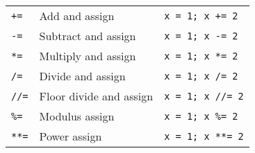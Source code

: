 \begin{table}[htbp]
\begin{minipage}{\linewidth}
\begin{tabulary}{\textwidth}{@{}LLL@{}}
    \texttt{+=}&Add and assign&\texttt{x = 1; x += 2}\\
    \texttt{-=}&Subtract and assign&\texttt{x = 1; x -= 2}\\
    \texttt{*=}&Multiply and assign&\texttt{x = 1; x *= 2}\\
    \texttt{\slash =}&Divide and assign&\texttt{x = 1; x \slash = 2}\\
    \texttt{/\slash =}&Floor divide and assign&\texttt{x = 1; x /\slash = 2}\\
    \texttt{\%=}&Modulus assign&\texttt{x = 1; x \%= 2}\\
    \texttt{**=}&Power assign&\texttt{x = 1; x **= 2}\\
    
    \bottomrule

  \end{tabulary}
      \end{minipage}
      \end{table}


    
      
    